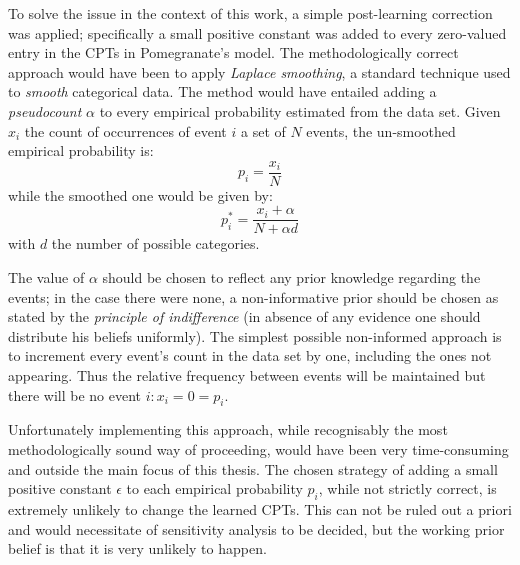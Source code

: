 To solve the issue in the context of this work, a simple post-learning correction was applied; specifically a small positive constant was added to every zero-valued entry in the CPTs in Pomegranate's model.
The methodologically correct approach would have been to apply \textit{Laplace smoothing}, a standard technique used to \textit{smooth} categorical data.
The method would have entailed adding a \textit{pseudocount} $\alpha$ to every empirical probability estimated from the data set.
Given $x_i$ the count of occurrences of event $i$ a set of $N$ events, the un-smoothed empirical probability is:
\begin{equation}
	p_i = \frac{x_{i}}{N}
\end{equation}
while the smoothed one would be given by:
\begin{equation}
	p_i^*=\frac{x_{i}+\alpha}{N+\alpha d}
\end{equation}
with $d$ the number of possible categories.

The value of $\alpha$ should be chosen to reflect any prior knowledge regarding the events; in the case there were none, a non-informative prior should be chosen as stated by the \textit{principle of indifference} (in absence of any evidence one should distribute his beliefs uniformly).
The simplest possible non-informed approach is to increment every event's count in the data set by one, including the ones not appearing.
Thus the relative frequency between events will be maintained but there will be no event $i : x_i=0=p_i$.

Unfortunately implementing this approach, while recognisably the most methodologically sound way of proceeding, would have been very time-consuming and outside the main focus of this thesis.
The chosen strategy of adding a small positive constant $\epsilon$ to each empirical probability $p_i$, while not strictly correct, is extremely unlikely to change the learned CPTs.
This can not be ruled out a priori and would necessitate of sensitivity analysis to be decided, but the working prior belief is that it is very unlikely to happen.

